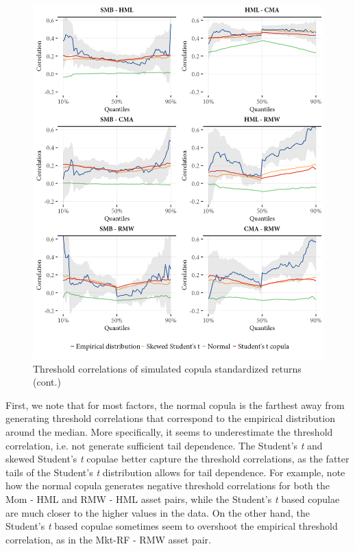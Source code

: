 \begin{figure}[!ht]
  \ContinuedFloat
  \centering
  \caption{Threshold correlations of simulated copula standardized returns (cont.)}
  \includegraphics[scale=1]{graphics/threshold_simulated_2.png}  
\end{figure}

First, we note that for most factors, the normal copula is the farthest away from generating threshold correlations that correspond to the empirical distribution around the median. More specifically, it seems to underestimate the threshold correlation, i.e. not generate sufficient tail dependence. The Student's \textit{t} and skewed Student's \textit{t} copulae better capture the threshold correlations, as the fatter tails of the Student's \textit{t} distribution allows for tail dependence. For example, note how the normal copula generates negative threshold correlations for both the Mom - HML and RMW - HML asset pairs, while the Student's \textit{t} based copulae are much closer to the higher values in the data. On the other hand, the Student's \textit{t} based copulae sometimes seem to overshoot the empirical threshold correlation, as in the Mkt-RF - RMW asset pair.

